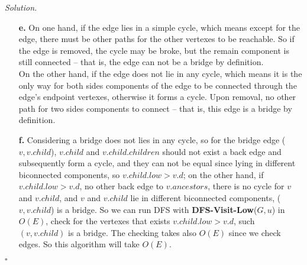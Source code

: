 \documentclass[11pt]{article}
\theoremstyle{definition}
\newenvironment{solution}{\noindent\emph{Solution.}}{\hfill$\square$}
\newcommand\tab[1][1cm]{\hspace*{#1}}
\begin{document}
\begin{solution}
\begin{enumerate}
  \item[\textbf{e.}] \tab On one hand, if the edge lies in a simple cycle, which means except for the edge, there must be other paths for the other vertexes to be reachable. So if the edge is removed, the cycle may be broke, but the remain component is still connected -- that is, the edge can not be a bridge by definition.\\
  \tab On the other hand, if the edge does not lie in any cycle, which means it is the only way for both sides components of the edge to be connected through the edge's endpoint vertexes, otherwise it forms a cycle. Upon removal, no other path for two sides components to connect --  that is, this edge is a bridge by definition.\\
  
  \item[\textbf{f.}] \tab Considering a bridge does not lies in any cycle, so for the bridge edge ($v, v.child$), $v.child$ and $v.child.children$ should not exist a back edge and subsequently form a cycle, and they can not be equal since lying in different biconnected components, so $v.child.low > v.d$; on the other hand, if $v.child.low > v.d$, no other back edge to $v.ancestors$, there is no cycle for $v$ and $v.child$, and $v$ and $v.child$ lie in different biconnected components, ($v, v.child$) is a bridge. So we can run DFS with \textbf{DFS-Visit-Low}($G,u$) in $O(E)$, check for the vertexes that exists $v.child.low > v.d$, such $(v, v.child)$ is a bridge. The checking takes also $O(E)$ since we check edges. So this algorithm will take $O(E)$.



\end{enumerate}


\end{solution}
\end{document}
